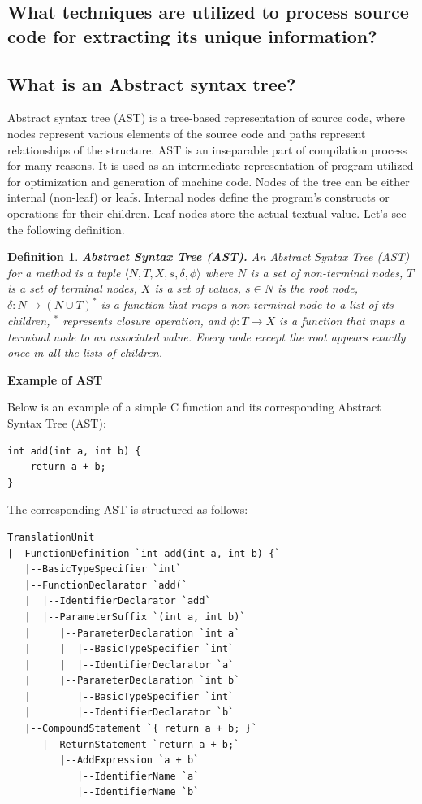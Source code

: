 \documentclass[10pt,english,a4paper]{report}
\newtheorem{definition}{Definition}
\begin{document}
\subsection{What techniques are utilized to process source code for extracting its unique information?}


\subsection{What is an Abstract syntax tree?}
\quad Abstract syntax tree (AST) is a tree-based representation of source code, where nodes represent various elements of the source code and paths represent relationships of the structure. AST is an inseparable part of compilation process for many reasons. It is used as an intermediate representation of program utilized for optimization and generation of machine code. Nodes of the tree can be either internal (non-leaf) or leafs. Internal nodes define the program's constructs or operations for their children. Leaf nodes store the actual textual value. Let's see the following definition.
\begin{definition}
\cite{sun2023AST}
\textbf{Abstract Syntax Tree (AST).} An Abstract Syntax Tree (AST) for a method is a tuple
$\langle N, T, X, s, \delta, \phi \rangle$ where $N$ is a set of non-terminal nodes, $T$ is a set of terminal nodes, $X$ is a set of values, $s \in N$ is the root node, $\delta : N \to (N \cup T)^*$ is a function that maps a non-terminal node to a list of its children, $^*$ represents closure operation, and $\phi : T \to X$ is a function that maps a terminal node to an associated value. Every node except the root appears exactly once in all the lists of children. 
\end{definition} 

\textbf{Example of AST}

Below is an example of a simple C function and its corresponding Abstract Syntax Tree (AST):
\begin{verbatim}
int add(int a, int b) {
    return a + b;
}
\end{verbatim}

The corresponding AST is structured as follows:
\begin{verbatim}
TranslationUnit 
|--FunctionDefinition `int add(int a, int b) {`
   |--BasicTypeSpecifier `int`
   |--FunctionDeclarator `add(`
   |  |--IdentifierDeclarator `add`
   |  |--ParameterSuffix `(int a, int b)`
   |     |--ParameterDeclaration `int a`
   |     |  |--BasicTypeSpecifier `int`
   |     |  |--IdentifierDeclarator `a`
   |     |--ParameterDeclaration `int b`
   |        |--BasicTypeSpecifier `int`
   |        |--IdentifierDeclarator `b`
   |--CompoundStatement `{ return a + b; }`
      |--ReturnStatement `return a + b;`
         |--AddExpression `a + b`
            |--IdentifierName `a`
            |--IdentifierName `b`
\end{verbatim}
\end{document}
